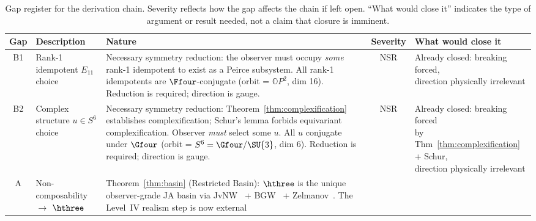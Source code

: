 \begin{table}[t]
\caption{Gap register for the derivation chain.  Severity reflects
how the gap affects the chain if left open.  ``What would close it''
indicates the type of argument or result needed, not a claim that
closure is imminent.}
\label{tab:gaps}
\begin{ruledtabular}
\begin{tabular}{cllcl}
Gap & Description & Nature & Severity & What would close it \\
\midrule
B1
  & Rank-1 idempotent $E_{11}$ choice
  & \makecell[l]{Necessary symmetry reduction: the observer must\\
    occupy \emph{some} rank-1 idempotent to exist as a\\
    Peirce subsystem. All rank-1 idempotents are\\
    $\Ffour$-conjugate (orbit = $\mathbb{O}P^2$, dim 16).\\
    Reduction is required; direction is gauge.}
  & NSR
  & \makecell[l]{Already closed: breaking forced,\\
    direction physically irrelevant} \\[4pt]
B2
  & Complex structure $u\in S^6$ choice
  & \makecell[l]{Necessary symmetry reduction:\\
    Theorem~\ref{thm:complexification} establishes complexification;\\
    Schur's lemma forbids equivariant complexification.\\
    Observer \emph{must} select some $u$.\\
    All $u$ conjugate under $\Gfour$\\
    (orbit = $S^6 = \Gfour/\SU{3}$, dim 6).\\
    Reduction is required; direction is gauge.}
  & NSR
  & \makecell[l]{Already closed: breaking forced\\
    by Thm~\ref{thm:complexification} + Schur,\\
    direction physically irrelevant} \\[4pt]
A
  & Non-composability $\to$ $\hthree$
  & \makecell[l]{Theorem~\ref{thm:basin} (Restricted Basin):\\
    $\hthree$ is the unique observer-grade JA basin\\
    via JvNW~\cite{JvNW1934} + BGW~\cite{BGW2020}\\
    + Zelmanov~\cite{Zelmanov1979}.\\
    The Level~IV realism step is now external\\
}
\end{tabular}
\end{ruledtabular}
\end{table}
